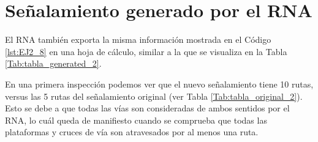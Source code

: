 \section{Señalamiento generado por el RNA}

	El RNA también exporta la misma información mostrada en el Código \ref{lst:EJ2_8} en una hoja de cálculo, similar a la que se visualiza en la Tabla \ref{Tab:tabla_generated_2}.   
    
    \begin{table}[H]
        {
        \caption{Tabla de enclavamiento del ejemplo 2 generada por el RNA.}
        \label{Tab:tabla_generated_2}
        \centering
     }
    \end{table}
    
    En una primera inspección podemos ver que el nuevo señalamiento tiene 10 rutas, versus las 5 rutas del señalamiento original (ver Tabla \ref{Tab:tabla_original_2}). Esto se debe a que todas las vías son consideradas de ambos sentidos por el RNA, lo cuál queda de manifiesto cuando se comprueba que todas las plataformas y cruces de vía son atravesados por al menos una ruta. 